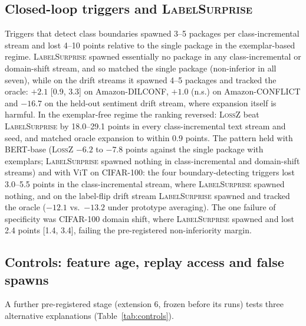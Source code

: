 \documentclass[10pt]{article}
\newcommand{\ls}{\textsc{LabelSurprise}}
\begin{document}
\subsection{Closed-loop triggers and \ls{}}
\label{sec:res-closed}
Triggers that detect class boundaries spawned 3--5 packages per class-incremental stream and lost 4--10 points relative to the single package in the exemplar-based regime. \ls{} spawned essentially no package in any class-incremental or domain-shift stream, and so matched the single package (non-inferior in all seven), while on the drift streams it spawned 4--5 packages and tracked the oracle: $+2.1$ [0.9, 3.3] on Amazon-DILCONF, $+1.0$ (n.s.) on Amazon-CONFLICT and $-16.7$ on the held-out sentiment drift stream, where expansion itself is harmful. In the exemplar-free regime the ranking reversed: \textsc{LossZ} beat \ls{} by 18.0--29.1 points in every class-incremental text stream and seed, and matched oracle expansion to within 0.9 points. The pattern held with BERT-base (\textsc{LossZ} $-6.2$ to $-7.8$ points against the single package with exemplars; \ls{} spawned nothing in class-incremental and domain-shift streams) and with ViT on CIFAR-100: the four boundary-detecting triggers lost 3.0--5.5 points in the class-incremental stream, where \ls{} spawned nothing, and on the label-flip drift stream \ls{} spawned and tracked the oracle ($-12.1$ vs.\ $-13.2$ under prototype averaging). The one failure of specificity was CIFAR-100 domain shift, where \ls{} spawned and lost 2.4 points [1.4, 3.4], failing the pre-registered non-inferiority margin.

\subsection{Controls: feature age, replay access and false spawns}
\label{sec:res-controls}

A further pre-registered stage (extension 6, frozen before its runs) tests three alternative explanations (Table~\ref{tab:controls}).
\end{document}
